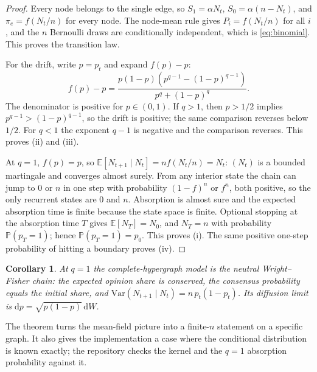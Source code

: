 \documentclass[conference]{IEEEtran}
\newcommand{\E}{\mathbb{E}}
\newcommand{\Prob}{\mathbb{P}}
\newcommand{\dd}{\mathrm{d}}
\newtheorem{corollary}{Corollary}
\begin{document}
\begin{proof}
Every node belongs to the single edge, so $S_1=\alpha N_t$, $S_0=\alpha(n-N_t)$, and $\pi_e=f(N_t/n)$ for every node. The node-mean rule gives $P_i=f(N_t/n)$ for all $i$, and the $n$ Bernoulli draws are conditionally independent, which is \eqref{eq:binomial}. This proves the transition law.

For the drift, write $p=p_t$ and expand $f(p)-p$:
\begin{equation}
f(p)-p
=\frac{p(1-p)\left(p^{q-1}-(1-p)^{q-1}\right)}
{p^{q}+(1-p)^{q}}.
\label{eq:drift}
\end{equation}
The denominator is positive for $p\in(0,1)$. If $q>1$, then $p>1/2$ implies $p^{q-1}>(1-p)^{q-1}$, so the drift is positive; the same comparison reverses below $1/2$. For $q<1$ the exponent $q-1$ is negative and the comparison reverses. This proves (ii) and (iii).

At $q=1$, $f(p)=p$, so $\E[N_{t+1}\mid N_t]=n f(N_t/n)=N_t$: $(N_t)$ is a bounded martingale and converges almost surely. From any interior state the chain can jump to $0$ or $n$ in one step with probability $(1-f)^n$ or $f^n$, both positive, so the only recurrent states are $0$ and $n$. Absorption is almost sure and the expected absorption time is finite because the state space is finite. Optional stopping at the absorption time $T$ gives $\E[N_T]=N_0$, and $N_T=n$ with probability $\Prob(p_T=1)$; hence $\Prob(p_T=1)=p_0$. This proves (i). The same positive one-step probability of hitting a boundary proves (iv).
\end{proof}

\begin{corollary}
At $q=1$ the complete-hypergraph model is the neutral Wright--Fisher chain: the expected opinion share is conserved, the consensus probability equals the initial share, and $\mathrm{Var}(N_{t+1}\mid N_t)=n\,p_t(1-p_t)$. Its diffusion limit is $\dd p=\sqrt{p(1-p)}\,\dd W$.
\end{corollary}

The theorem turns the mean-field picture into a finite-$n$ statement on a specific graph. It also gives the implementation a case where the conditional distribution is known exactly; the repository checks the kernel and the $q=1$ absorption probability against it.
\end{document}
